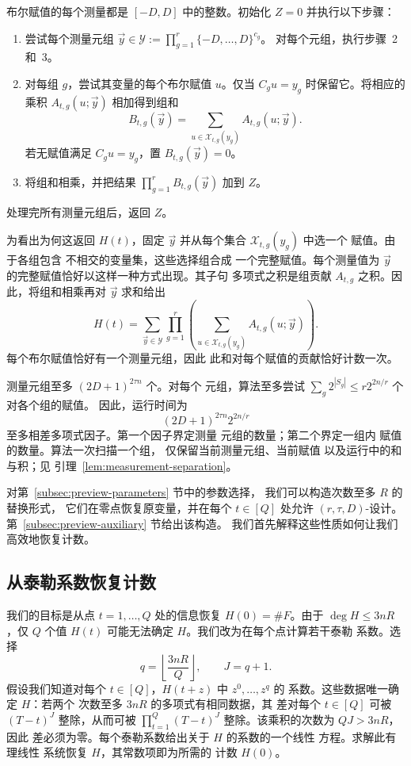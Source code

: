 \documentclass[11pt,reqno]{amsart}
\numberwithin{equation}{section}
\theoremstyle{definition}\newtheorem{definition}[theorem]{定义}
\theoremstyle{remark}\newtheorem{remark}[theorem]{注}
\renewcommand{\le}{\leqslant}
\begin{document}
布尔赋值的每个测量都是
$[-D,D]$ 中的整数。初始化 $Z=0$ 并执行以下步骤：
\begin{enumerate}
\item 尝试每个测量元组
$\vec{y}\in\mathcal Y:=\prod_{g=1}^r\{-D,\ldots,D\}^{c_g}$。
对每个元组，执行步骤~2 和~3。
\item 对每组 $g$，尝试其变量的每个布尔赋值 $u$。仅当 $C_gu=y_g$ 时保留它。将相应的
乘积 $A_{t,g}(u;\vec{y})$ 相加得到组和
\[
 B_{t,g}(\vec{y})=
 \sum_{u\in\mathcal X_{t,g}(y_g)}A_{t,g}(u;\vec{y}).
\]
若无赋值满足 $C_gu=y_g$，置 $B_{t,g}(\vec{y})=0$。
\item 将组和相乘，并把结果
$\prod_{g=1}^r B_{t,g}(\vec{y})$ 加到 $Z$。
\end{enumerate}
处理完所有测量元组后，返回 $Z$。

为看出为何这返回 $H(t)$，固定 $\vec{y}$ 并从每个集合 $\mathcal X_{t,g}(y_g)$ 中选一个
赋值。由于各组包含
不相交的变量集，这些选择组合成
一个完整赋值。每个测量值为
$\vec{y}$ 的完整赋值恰好以这样一种方式出现。其子句
多项式之积是组贡献
$A_{t,g}$ 之积。因此，将组和相乘再对
$\vec{y}$ 求和给出
\begin{equation}\label{eq:outline-separated-sum}
 H(t)=\sum_{\vec{y}\in\mathcal Y}\prod_{g=1}^r
       \left(\sum_{u\in\mathcal X_{t,g}(y_g)}
                         A_{t,g}(u;\vec{y})\right).
\end{equation}
每个布尔赋值恰好有一个测量元组，因此
此和对每个赋值的贡献恰好计数一次。

测量元组至多 $(2D+1)^{2\tau n}$ 个。对每个
元组，算法至多尝试
$\sum_g2^{|S_g|}\le r2^{2n/r}$ 个对各个组的赋值。
因此，运行时间为
\[
 (2D+1)^{2\tau n}2^{2n/r}
\]
至多相差多项式因子。第一个因子界定测量
元组的数量；第二个界定一组内
赋值的数量。算法一次扫描一个组，
仅保留当前测量元组、当前赋值
以及运行中的和与积；见
引理~\ref{lem:measurement-separation}。

对第~\ref{subsec:preview-parameters} 节中的参数选择，
我们可以构造次数至多 $R$ 的替换形式，
它们在零点恢复原变量，并在每个 $t\in[Q]$ 处允许
$(r,\tau,D)$-设计。
第~\ref{subsec:preview-auxiliary} 节给出该构造。
我们首先解释这些性质如何让我们
高效地恢复计数。

\subsection{从泰勒系数恢复计数}
\label{subsec:preview-interpolation}
我们的目标是从点
$t=1,\ldots,Q$ 处的信息恢复 $H(0)=\#F$。由于 $\deg H\le3nR$，仅 $Q$ 个值 $H(t)$
可能无法确定 $H$。我们改为在每个点计算若干泰勒
系数。选择
\[
 q=\left\lfloor\frac{3nR}{Q}\right\rfloor,\qquad J=q+1.
\]
假设我们知道对每个 $t\in[Q]$，$H(t+z)$ 中 $z^0,\ldots,z^q$ 的
系数。这些数据唯一确定 $H$：若两个
次数至多 $3nR$ 的多项式有相同数据，其
差对每个 $t\in[Q]$ 可被 $(T-t)^J$ 整除，从而可被
$\prod_{t=1}^Q(T-t)^J$ 整除。该乘积的次数为 $QJ>3nR$，因此
差必须为零。每个泰勒系数给出关于 $H$ 的系数的一个线性
方程。求解此有理线性
系统恢复 $H$，其常数项即为所需的
计数 $H(0)$。
\end{document}
